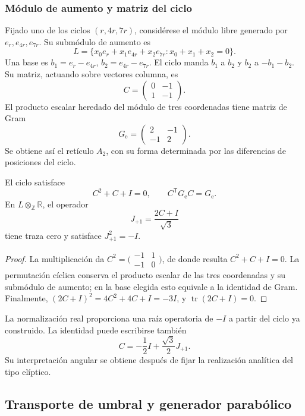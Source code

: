 \subsubsection{Módulo de aumento y matriz del ciclo}

Fijado uno de los ciclos \((r,4r,7r)\), considérese el módulo libre
generado por \(e_r,e_{4r},e_{7r}\). Su submódulo de aumento es
\[
 L=\{x_0e_r+x_1e_{4r}+x_2e_{7r}:x_0+x_1+x_2=0\}.
\]
Una base es \(b_1=e_r-e_{4r}\), \(b_2=e_{4r}-e_{7r}\). El ciclo
manda \(b_1\) a \(b_2\) y \(b_2\) a \(-b_1-b_2\). Su matriz,
actuando sobre vectores columna, es
\[
 C=\begin{pmatrix}0&-1\\1&-1\end{pmatrix}.
\]
El producto escalar heredado del módulo de tres coordenadas tiene matriz
de Gram
\[
 G_{\mathrm e}=\begin{pmatrix}2&-1\\-1&2\end{pmatrix}.
\]
Se obtiene así el retículo \(A_2\), con su forma determinada por las
diferencias de posiciones del ciclo.

\begin{proposicion}
\label{eul:prop:eliptico}
El ciclo satisface
\[
 C^2+C+I=0,\qquad C^\mathsf TG_{\mathrm e}C=G_{\mathrm e}.
\]
En \(L\otimes_{\mathbb Z}\mathbb R\), el operador
\[
 J_{+1}=\frac{2C+I}{\sqrt3}
\]
tiene traza cero y satisface \(J_{+1}^2=-I\).
\end{proposicion}
\begin{proof}
La multiplicación da
\(C^2=\bigl(\begin{smallmatrix}-1&1\\-1&0\end{smallmatrix}\bigr)\),
de donde resulta \(C^2+C+I=0\). La permutación cíclica conserva el
producto escalar de las tres coordenadas y su submódulo de aumento;
en la base elegida esto equivale a la identidad de Gram. Finalmente,
\((2C+I)^2=4C^2+4C+I=-3I\), y
\(\operatorname{tr}(2C+I)=0\).
\end{proof}

La normalización real proporciona una raíz operatoria de \(-I\) a
partir del ciclo ya construido. La identidad puede escribirse también
\[
 C=-\frac12I+\frac{\sqrt3}{2}J_{+1}.
\]
Su interpretación angular se obtiene después de fijar la realización
analítica del tipo elíptico.

\subsection{Transporte de umbral y generador parabólico}
\label{eul:parabolico}

